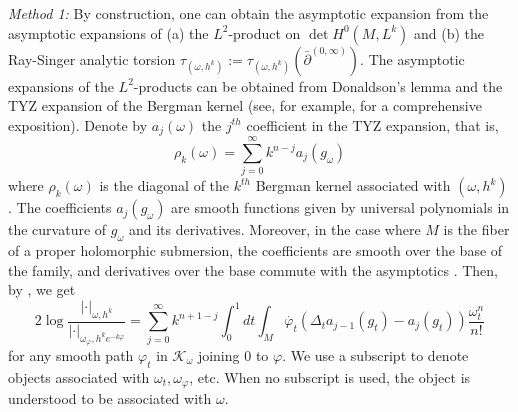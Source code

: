 \documentclass[12pt,reqno,a4paper]{amsart}
\numberwithin{equation}{section}
\theoremstyle{definition}
\theoremstyle{remark}
\begin{document}
\textit{Method 1:} By construction, one can obtain the asymptotic expansion from the asymptotic expansions of (a) the $L^2$-product on $\det H^0(M,L^k)$ and (b) the Ray-Singer analytic torsion $\tau_{(\omega,h^k)}:=\tau_{(\omega,h^k)}(\bar{\partial}^{(0,\infty)})$. The asymptotic expansions of the $L^2$-products can be obtained from Donaldson's lemma and the TYZ expansion of the Bergman kernel (see, for example, \cite{ma2007holomorphic} for a comprehensive exposition). Denote by $a_j(\omega)$ the $j^{th}$ coefficient in the TYZ expansion, that is,
\begin{equation*}
\rho_k(\omega)=\sum_{j=0}^\infty k^{n-j} a_j(g_\omega) 
\end{equation*}
where $\rho_k(\omega)$ is the diagonal of the $k^{th}$ Bergman kernel associated with $(\omega,h^k)$. The coefficients $a_j(g_\omega)$ are smooth functions given by universal polynomials in the curvature of $g_\omega$ and its derivatives. Moreover, in the case where $M$ is the fiber of a proper holomorphic submersion, the coefficients are smooth over the base of the family, and derivatives over the base commute with the asymptotics \cite[Theorem 1.6]{ma2023superconnection}. Then, by \cite[Lemma 2]{donaldson2005scalar}, we get
\begin{equation*}
2\log \frac{|\cdot|_{\omega,h^k}}{|\cdot|_{\omega_\varphi,h^ke^{-k\varphi}}}=\sum_{j=0}^\infty k^{n+1-j}\int_0^1 dt\int_M \dot{\varphi_t}(\Delta_t a_{j-1}(g_t)-a_{j}(g_t))\frac{\omega_t^n}{n!}
\end{equation*}
for any smooth path $\varphi_t$ in $\mathcal{K}_\omega$ joining $0$ to $\varphi$. We use a subscript to denote objects associated with $\omega_t, \omega_\varphi$, etc. When no subscript is used, the object is understood to be associated with $\omega$.
\end{document}
